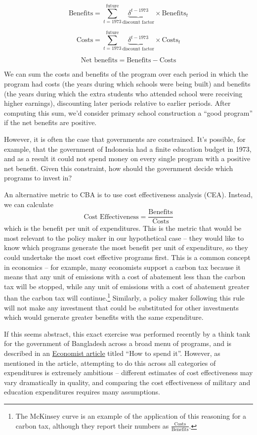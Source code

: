 \documentclass[12pt,english]{article}
\begin{document}
$$ \text{Benefits} = \sum_{t = 1973}^{\text{future}} \underbrace{\delta^{t - 1973}}_{\text{discount factor}} \times \text{Benefits}_{t} $$

$$ \text{Costs} = \sum_{t = 1973}^{\text{future}} \underbrace{\delta^{t - 1973}}_{\text{discount factor}} \times \text{Costs}_{t} $$

$$ \text{Net benefits} = \text{Benefits} - \text{Costs} $$

We can sum the costs and benefits of the program over each period in which the program had costs (the years during which schools were being built) and benefits (the years during which the extra students who attended school were receiving higher earnings), discounting later periods relative to earlier periods. After computing this sum, we'd consider primary school construction a ``good program'' if the net benefits are positive.

However, it is often the case that governments are constrained. It's possible, for example, that the government of Indonesia had a finite education budget in 1973, and as a result it could not spend money on every single program with a positive net benefit. Given this constraint, how should the government decide which programs to invest in?

An alternative metric to CBA is to use cost effectiveness analysis (CEA). Instead, we can calculate
$$ \text{Cost Effectiveness} = \frac{\text{Benefits}}{\text{Costs}} $$
which is the benefit per unit of expenditures. This is the metric that would be most relevant to the policy maker in our hypothetical case -- they would like to know which programs generate the most benefit per unit of expenditure, so they could undertake the most cost effective programs first. This is a common concept in economics -- for example, many economists support a carbon tax because it means that any unit of emissions with a cost of abatement less than the carbon tax will be stopped, while any unit of emissions with a cost of abatement greater than the carbon tax will continue.\footnote{The McKinsey curve is an example of the application of this reasoning for a carbon tax, although they report their numbers as $\frac{\text{Costs}}{\text{Benefits}}$.} Similarly, a policy maker following this rule will not make any investment that could be substituted for other investments which would generate greater benefits with the same expenditure.

If this seems abstract, this exact exercise was performed recently by a think tank for the government of Bangladesh across a broad menu of programs, and is described in an \href{http://www.economist.com/news/finance-and-economics/21698302-ambitious-attempt-work-out-best-use-scarce-resources-how-spend-it}{Economist article} titled ``How to spend it''. However, as mentioned in the article, attempting to do this across all categories of expenditures is extremely ambitious -- different estimates of cost effectiveness may vary dramatically in quality, and comparing the cost effectiveness of military and education expenditures requires many assumptions.
\end{document}

